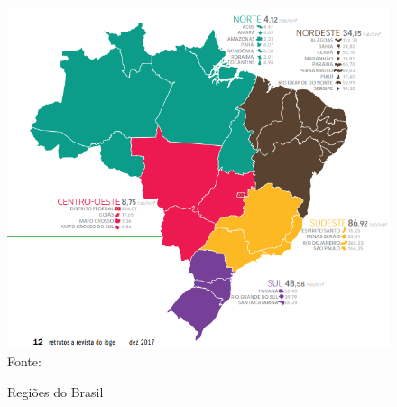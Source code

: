 \begin{figure}[ht]
    \centering
    \caption{Regiões do Brasil}
    \includegraphics[width=1\linewidth]{figuras/regioes/regioes_brasil.PNG}
    \label{fig:regioes_brasil}
    \footnotesize{Fonte: \cite{HAMAM_Cinco_2017}}
\end{figure}
